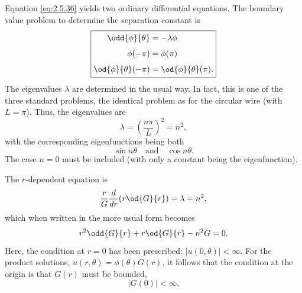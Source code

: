 Equation \eqref{eq:2.5.36} yields two ordinary differential equations. The boundary value problem to determine the separation constant is
\begin{equation}
\label{eq:2.5.37}
\boxed{\begin{aligned}
\odd{\phi}{\theta} &= -\lambda\phi \\[4pt]
\phi(-\pi) &= \phi(\pi) \\[4pt]
\od{\phi}{\theta}(-\pi) &= \od{\phi}{\theta}(\pi).
\end{aligned}}
\end{equation}
The eigenvalues $\lambda$ are determined in the usual way. In fact, this is one of the three standard problems, the identical problem as for the circular wire (with $L = \pi$). Thus, the eigenvalues are
\begin{equation}
\label{eq:2.5.38}
\lambda = \left(\frac{n\pi}{L}\right)^2 = n^2,
\end{equation}
with the corresponding eigenfunctions being both
\begin{equation}
\label{eq:2.5.39}
\sin n\theta \quad\text{and}\quad \cos n\theta.
\end{equation}
The case $n = 0$ must be included (with only a constant being the eigenfunction).

The $r$-dependent equation is
\begin{equation}
\label{eq:2.5.40}
\frac{r}{G}\frac{d}{d r}\!\left(r\od{G}{r}\right) = \lambda = n^2,
\end{equation}
which when written in the more usual form becomes
\begin{equation}
\label{eq:2.5.41}
r^2\odd{G}{r} + r\od{G}{r} - n^2 G = 0.
\end{equation}
Here, the condition at $r = 0$ has been prescribed: $|u(0,\theta)| < \infty$. For the product solutions, $u(r,\theta) = \phi(\theta)G(r)$, it follows that the condition at the origin is that $G(r)$ must be bounded,
\begin{equation}
\label{eq:2.5.42}
|G(0)| < \infty.
\end{equation}

